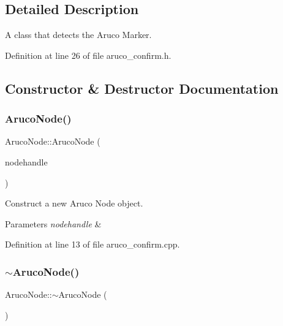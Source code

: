 \subsection{Detailed Description}
A class that detects the Aruco Marker. 

Definition at line 26 of file aruco\+\_\+confirm.\+h.



\subsection{Constructor \& Destructor Documentation}
\mbox{\label{class_aruco_node_ad539e5027a1d41e9e62f354db9ec40aa}} 
\subsubsection{\texorpdfstring{Aruco\+Node()}{ArucoNode()}}
{\footnotesize\ttfamily Aruco\+Node\+::\+Aruco\+Node (\begin{DoxyParamCaption}\item[{ros\+::\+Node\+Handle $\ast$}]{nodehandle }\end{DoxyParamCaption})}



Construct a new Aruco Node object. 


\begin{DoxyParams}{Parameters}
{\em nodehandle} & \\
\hline
\end{DoxyParams}


Definition at line 13 of file aruco\+\_\+confirm.\+cpp.

\mbox{\label{class_aruco_node_a134694163a28530a800198e2c039eb25}} 
\subsubsection{\texorpdfstring{$\sim$\+Aruco\+Node()}{~ArucoNode()}}
{\footnotesize\ttfamily Aruco\+Node\+::$\sim$\+Aruco\+Node (\begin{DoxyParamCaption}{ }\end{DoxyParamCaption})\hspace{0.3cm}{\ttfamily [inline]}}



